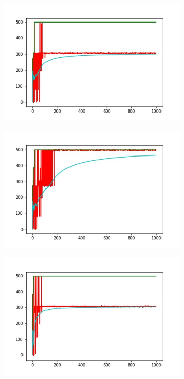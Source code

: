 \begin{figure}
\begin{subfigure}[b]{0.39\textwidth}
        \includegraphics[width=\textwidth]{grafi8.jpg}
        \label{fig:tiger}
    \end{subfigure}
    \begin{subfigure}[b]{0.39\textwidth}
        \includegraphics[width=\textwidth]{grafi9.jpg}
        \label{fig:mouse}
    \end{subfigure}
    \begin{subfigure}[b]{0.39\textwidth}
        \includegraphics[width=\textwidth]{grafi10.jpg}

\end{subfigure}
\end{figure}
